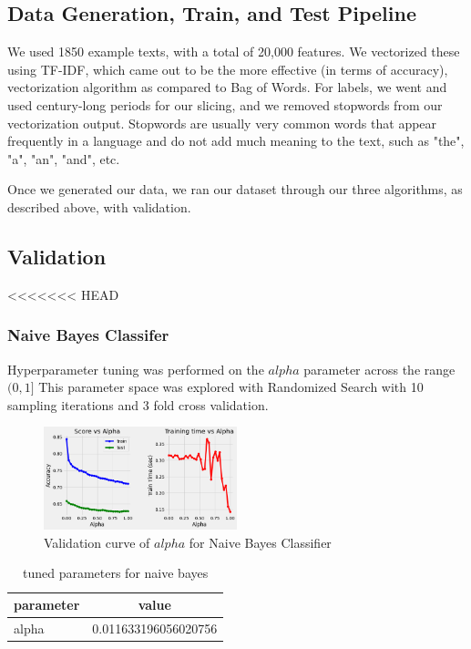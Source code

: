 \documentclass{article}
\begin{document}
\subsection{Data Generation, Train, and Test Pipeline}
We used 1850 example texts, with a total of 20,000 features. We vectorized these using TF-IDF, 
which came out to be the more effective (in terms of accuracy), vectorization algorithm as 
compared to Bag of Words. For labels, we went and used century-long periods for our slicing, 
and we removed stopwords from our vectorization output. Stopwords are usually very 
common words that appear frequently in a language and do not add much meaning to the text, 
such as "the", "a", "an", "and", etc. 

Once we generated our data, we ran our dataset through our three algorithms, as described above, 
with validation.


\subsection{Validation}

<<<<<<< HEAD
\subsubsection{Naive Bayes Classifer}
  Hyperparameter tuning was performed on the $alpha$ parameter across the range $(0, 1]$ This parameter
  space was explored with Randomized Search with 10 sampling iterations and 3 fold cross validation. 

\begin{figure}[h]
  \centering
  \includegraphics[width=0.5\textwidth]{naivebayes_validation_curve.png}
  \caption{Validation curve of $alpha$ for Naive Bayes Classifier}
  \end{figure}

\begin{table}[ht]
\centering
\caption{tuned parameters for naive bayes}
\begin{tabular}{l|c}
\toprule
parameter & value \\
\midrule
alpha & 0.011633196056020756 \\
\bottomrule
\end{tabular}
\end{table}
\end{document}
